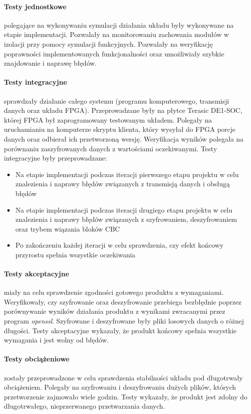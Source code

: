 \paragraph{Testy jednostkowe} polegające na wykonywaniu symulacji działania układu były wykonywane na etapie implementacji. Pozwalały na monitorowaniu zachowania modułów w izolacji przy pomocy symulacji funkcyjnych. Pozwalały na weryfikację poprawności implementowanych funkcjonalności oraz umożliwiały szybkie znajdowanie i naprawę błędów.

\paragraph{Testy integracyjne} sprawdzały działanie całego systemu (programu komputerowego, transmisji danych oraz układu FPGA). Przeprowadzane były na płytce Terasic DE1-SOC, której FPGA był zaprogramowany testowanym układem. Polegały na uruchamianiu na komputerze skryptu klienta, który wysyłał do FPGA porcje danych oraz odbierał ich przetworzoną wersję. Weryfikacja wyników polegała na porównaniu zaszyfrowanych danych z wartościami oczekiwanymi. Testy integracyjne były przeprowadzane:
\begin{itemize}
\item Na etapie implementacji podczas iteracji pierwszego etapu projektu w celu znalezienia i naprawy błędów związanych z transmisją danych i obsługą błędów
\item Na etapie implementacji podczas iteracji drugiego etapu projektu w celu znalezienia i naprawy błędów związanych z szyfrowaniem, deszyfrowaniem oraz trybem wiązania bloków CBC
\item Po zakończeniu każdej iteracji w celu sprawdzenia, czy efekt końcowy przyrostu spełnia wszystkie oczekiwania
\end{itemize}

\paragraph{Testy akceptacyjne} miały na celu sprawdzenie zgodności gotowego produktu z wymaganiami. Weryfikowały, czy szyfrowanie oraz deszyfrowanie przebiega bezbłędnie poprzez porównywanie wyników działania produktu z wynikami zwracanymi przez program \textit{openssl}. Szyfrowane i deszyfrowane były pliki losowych danych o różnej długości. Testy akceptacyjne wykazały, że  produkt końcowy spełnia wszystkie wymagania i jest wolny od błędów.

\paragraph{Testy obciążeniowe} zostały przeprowadzone w celu sprawdzenia stabilności układu pod długotrwały obciążeniem. Polegały na szyfrowaniu i deszyfrowaniu dużych plików, których przetworzenie zajmowało wiele godzin. Testy wykazały, że produkt jest zdolny do długotrwałego, nieprzerwanego przetwarzania danych. 

